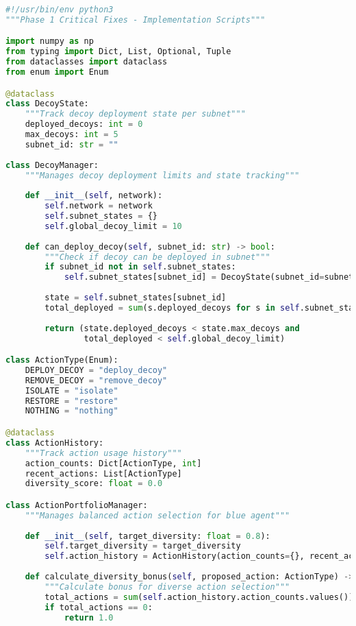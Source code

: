 \documentclass[12pt,a4paper]{article}
\begin{document}
\begin{lstlisting}[language=Python, caption=Critical Training Fixes]
#!/usr/bin/env python3
"""Phase 1 Critical Fixes - Implementation Scripts"""

import numpy as np
from typing import Dict, List, Optional, Tuple
from dataclasses import dataclass
from enum import Enum

@dataclass
class DecoyState:
    """Track decoy deployment state per subnet"""
    deployed_decoys: int = 0
    max_decoys: int = 5
    subnet_id: str = ""
    
class DecoyManager:
    """Manages decoy deployment limits and state tracking"""
    
    def __init__(self, network):
        self.network = network
        self.subnet_states = {}
        self.global_decoy_limit = 10
        
    def can_deploy_decoy(self, subnet_id: str) -> bool:
        """Check if decoy can be deployed in subnet"""
        if subnet_id not in self.subnet_states:
            self.subnet_states[subnet_id] = DecoyState(subnet_id=subnet_id)
        
        state = self.subnet_states[subnet_id]
        total_deployed = sum(s.deployed_decoys for s in self.subnet_states.values())
        
        return (state.deployed_decoys < state.max_decoys and 
                total_deployed < self.global_decoy_limit)

class ActionType(Enum):
    DEPLOY_DECOY = "deploy_decoy"
    REMOVE_DECOY = "remove_decoy" 
    ISOLATE = "isolate"
    RESTORE = "restore"
    NOTHING = "nothing"

@dataclass
class ActionHistory:
    """Track action usage history"""
    action_counts: Dict[ActionType, int]
    recent_actions: List[ActionType]
    diversity_score: float = 0.0

class ActionPortfolioManager:
    """Manages balanced action selection for blue agent"""
    
    def __init__(self, target_diversity: float = 0.8):
        self.target_diversity = target_diversity
        self.action_history = ActionHistory(action_counts={}, recent_actions=[])
        
    def calculate_diversity_bonus(self, proposed_action: ActionType) -> float:
        """Calculate bonus for diverse action selection"""
        total_actions = sum(self.action_history.action_counts.values())
        if total_actions == 0:
            return 1.0
            

\end{lstlisting}
\end{document}
